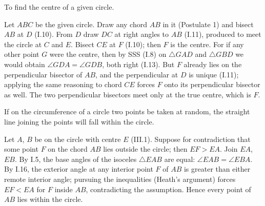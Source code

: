 \documentclass{rrxiv}
\begin{document}
\begin{claim}
\label{prop:III.1}
To find the centre of a given circle.
\end{claim}
\begin{evidence}
\label{ev:III.1}
Let $ABC$ be the given circle.  Draw any chord $AB$ in it (Postulate
1) and bisect $AB$ at $D$ (I.10).  From $D$ draw $DC$ at right
angles to $AB$ (I.11), produced to meet the circle at $C$ and $E$.
Bisect $CE$ at $F$ (I.10); then $F$ is the centre.  For if any other
point $G$ were the centre, then by SSS (I.8) on $\triangle GAD$ and
$\triangle GBD$ we would obtain $\angle GDA = \angle GDB$, both
right (I.13).  But $F$ already lies on the perpendicular bisector
of $AB$, and the perpendicular at $D$ is unique (I.11); applying
the same reasoning to chord $CE$ forces $F$ onto its perpendicular
bisector as well.  The two perpendicular bisectors meet only at the
true centre, which is $F$.
\end{evidence}

\begin{claim}
\label{prop:III.2}
If on the circumference of a circle two points be taken at random,
the straight line joining the points will fall within the circle.
\end{claim}
\begin{evidence}
\label{ev:III.2}
Let $A$, $B$ be on the circle with centre $E$ (III.1).  Suppose for
contradiction that some point $F$ on the chord $AB$ lies outside the
circle; then $EF > EA$.  Join $EA$, $EB$.  By I.5, the base angles
of the isoceles $\triangle EAB$ are equal: $\angle EAB = \angle
EBA$.  By I.16, the exterior angle at any interior point $F$ of
$AB$ is greater than either remote interior angle; pursuing the
inequalities (Heath's argument) forces $EF < EA$ for $F$ inside
$AB$, contradicting the assumption.  Hence every point of $AB$ lies
within the circle.
\end{evidence}
\end{document}
